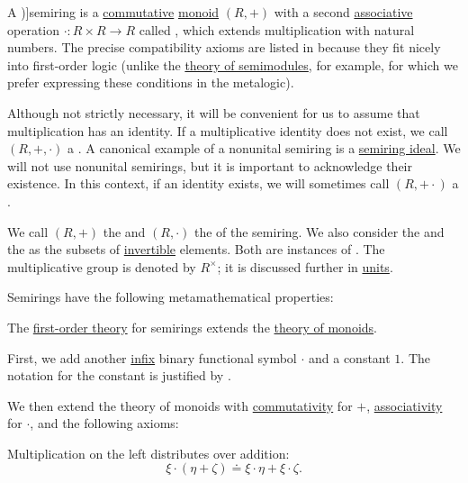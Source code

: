 \begin{definition}\label{def:semiring}
  A \term[ru=полукольцо (\cite[4]{ВечтомовПетров2022})]{semiring} is a \hyperref[def:binary_operation/commutative]{commutative} \hyperref[def:monoid]{monoid} \( (R, +) \) with a second \hyperref[def:binary_operation/associative]{associative} operation \( \cdot: R \times R \to R \) called , which extends multiplication with natural numbers. The precise compatibility axioms are listed in  because they fit nicely into first-order logic (unlike the \hyperref[def:semimodule/theory]{theory of semimodules}, for example, for which we prefer expressing these conditions in the metalogic).

  Although not strictly necessary, it will be convenient for us to assume that multiplication has an identity. If a multiplicative identity does not exist, we call \( (R, +, \cdot) \) a . A canonical example of a nonunital semiring is a \hyperref[def:semiring_ideal]{semiring ideal}. We will not use nonunital semirings, but it is important to acknowledge their existence. In this context, if an identity exists, we will sometimes call \( (R, + \cdot) \) a .

  We call \( (R, +) \) the  and \( (R, \cdot) \) the  of the semiring. We also consider the  and the  as the subsets of \hyperref[def:monoid_inverse]{invertible} elements. Both are instances of . The multiplicative group is denoted by \( R^\times \); it is discussed further in \hyperref[def:divisibility/unit]{units}.

  Semirings have the following metamathematical properties:
  \begin{thmenum}
     The \hyperref[def:first_order_theory]{first-order theory} for semirings extends the \hyperref[def:monoid/theory]{theory of monoids}.

    First, we add another \hyperref[rem:first_order_formula_conventions/infix]{infix} binary functional symbol \( \cdot \) and a constant \( 1 \). The notation for the constant is justified by .

    We then extend the theory of monoids with \hyperref[def:binary_operation/commutative]{commutativity} for \( + \), \hyperref[def:binary_operation/associative]{associativity} for \( \cdot \), and the following axioms:
    \begin{thmenum}
       Multiplication on the left distributes over addition:
      \begin{equation}\label{eq:def:semiring/left_distributivity}
        \xi \cdot (\eta + \zeta) \doteq \xi \cdot \eta + \xi \cdot \zeta.
      \end{equation}


\end{thmenum}
\end{thmenum}
\end{definition}
